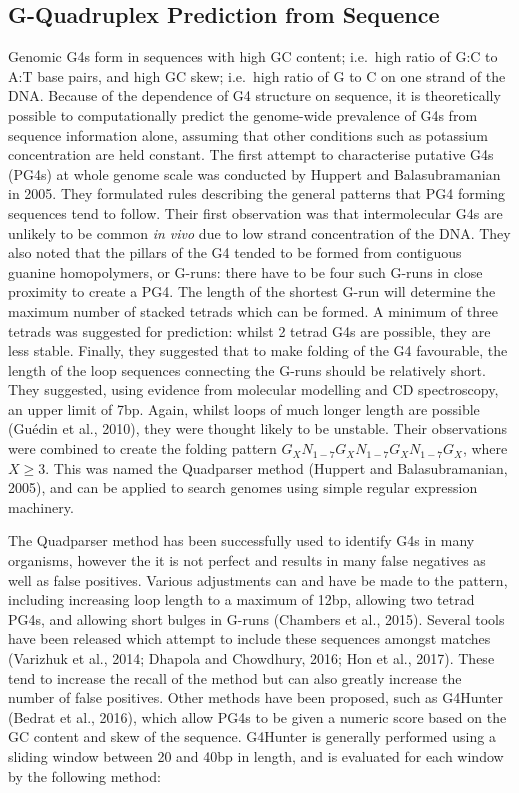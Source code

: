 \documentclass[12pt,a4paper,]{report}
\begin{document}
\newpage

\hypertarget{g-quadruplex-prediction-from-sequence}{%
\subsection{G-Quadruplex Prediction from
Sequence}\label{g-quadruplex-prediction-from-sequence}}

\label{ssec:predict_g4s}

Genomic G4s form in sequences with high GC content; i.e.~high ratio of
G:C to A:T base pairs, and high GC skew; i.e.~high ratio of G to C on
one strand of the DNA. Because of the dependence of G4 structure on
sequence, it is theoretically possible to computationally predict the
genome-wide prevalence of G4s from sequence information alone, assuming
that other conditions such as potassium concentration are held constant.
The first attempt to characterise putative G4s (PG4s) at whole genome
scale was conducted by Huppert and Balasubramanian in 2005. They
formulated rules describing the general patterns that PG4 forming
sequences tend to follow. Their first observation was that
intermolecular G4s are unlikely to be common \emph{in vivo} due to low
strand concentration of the DNA. They also noted that the pillars of the
G4 tended to be formed from contiguous guanine homopolymers, or G-runs:
there have to be four such G-runs in close proximity to create a PG4.
The length of the shortest G-run will determine the maximum number of
stacked tetrads which can be formed. A minimum of three tetrads was
suggested for prediction: whilst 2 tetrad G4s are possible, they are
less stable. Finally, they suggested that to make folding of the G4
favourable, the length of the loop sequences connecting the G-runs
should be relatively short. They suggested, using evidence from
molecular modelling and CD spectroscopy, an upper limit of 7bp. Again,
whilst loops of much longer length are possible (Guédin et al., 2010),
they were thought likely to be unstable. Their observations were
combined to create the folding pattern
\(G_XN_{1-7}G_XN_{1-7}G_XN_{1-7}G_X\), where \(X \geq 3\). This was
named the Quadparser method (Huppert and Balasubramanian, 2005), and can
be applied to search genomes using simple regular expression machinery.

The Quadparser method has been successfully used to identify G4s in many
organisms, however the it is not perfect and results in many false
negatives as well as false positives. Various adjustments can and have
be made to the pattern, including increasing loop length to a maximum of
12bp, allowing two tetrad PG4s, and allowing short bulges in G-runs
(Chambers et al., 2015). Several tools have been released which attempt
to include these sequences amongst matches (Varizhuk et al., 2014;
Dhapola and Chowdhury, 2016; Hon et al., 2017). These tend to increase
the recall of the method but can also greatly increase the number of
false positives. Other methods have been proposed, such as G4Hunter
(Bedrat et al., 2016), which allow PG4s to be given a numeric score
based on the GC content and skew of the sequence. G4Hunter is generally
performed using a sliding window between 20 and 40bp in length, and is
evaluated for each window by the following method:
\end{document}
